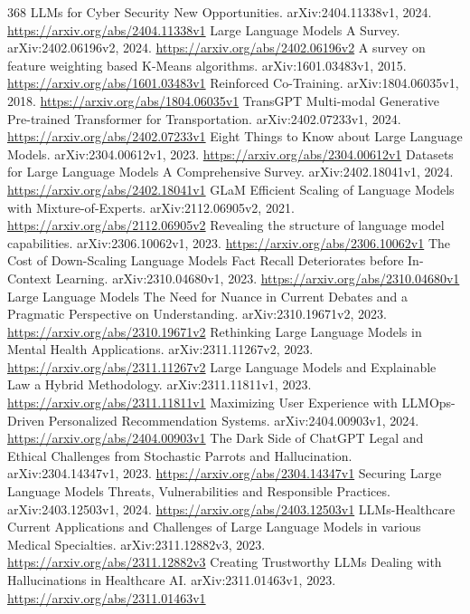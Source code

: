 \documentclass[11pt]{article}
\begin{document}
\begin{thebibliography}{368}
 LLMs for Cyber Security New Opportunities. arXiv:2404.11338v1, 2024. \url{https://arxiv.org/abs/2404.11338v1}
 Large Language Models A Survey. arXiv:2402.06196v2, 2024. \url{https://arxiv.org/abs/2402.06196v2}
 A survey on feature weighting based K-Means algorithms. arXiv:1601.03483v1, 2015. \url{https://arxiv.org/abs/1601.03483v1}
 Reinforced Co-Training. arXiv:1804.06035v1, 2018. \url{https://arxiv.org/abs/1804.06035v1}
 TransGPT Multi-modal Generative Pre-trained Transformer for Transportation. arXiv:2402.07233v1, 2024. \url{https://arxiv.org/abs/2402.07233v1}
 Eight Things to Know about Large Language Models. arXiv:2304.00612v1, 2023. \url{https://arxiv.org/abs/2304.00612v1}
 Datasets for Large Language Models A Comprehensive Survey. arXiv:2402.18041v1, 2024. \url{https://arxiv.org/abs/2402.18041v1}
 GLaM Efficient Scaling of Language Models with Mixture-of-Experts. arXiv:2112.06905v2, 2021. \url{https://arxiv.org/abs/2112.06905v2}
 Revealing the structure of language model capabilities. arXiv:2306.10062v1, 2023. \url{https://arxiv.org/abs/2306.10062v1}
 The Cost of Down-Scaling Language Models Fact Recall Deteriorates before In-Context Learning. arXiv:2310.04680v1, 2023. \url{https://arxiv.org/abs/2310.04680v1}
 Large Language Models The Need for Nuance in Current Debates and a Pragmatic Perspective on Understanding. arXiv:2310.19671v2, 2023. \url{https://arxiv.org/abs/2310.19671v2}
 Rethinking Large Language Models in Mental Health Applications. arXiv:2311.11267v2, 2023. \url{https://arxiv.org/abs/2311.11267v2}
 Large Language Models and Explainable Law a Hybrid Methodology. arXiv:2311.11811v1, 2023. \url{https://arxiv.org/abs/2311.11811v1}
 Maximizing User Experience with LLMOps-Driven Personalized Recommendation Systems. arXiv:2404.00903v1, 2024. \url{https://arxiv.org/abs/2404.00903v1}
 The Dark Side of ChatGPT Legal and Ethical Challenges from Stochastic Parrots and Hallucination. arXiv:2304.14347v1, 2023. \url{https://arxiv.org/abs/2304.14347v1}
 Securing Large Language Models Threats, Vulnerabilities and Responsible Practices. arXiv:2403.12503v1, 2024. \url{https://arxiv.org/abs/2403.12503v1}
 LLMs-Healthcare Current Applications and Challenges of Large Language Models in various Medical Specialties. arXiv:2311.12882v3, 2023. \url{https://arxiv.org/abs/2311.12882v3}
 Creating Trustworthy LLMs Dealing with Hallucinations in Healthcare AI. arXiv:2311.01463v1, 2023. \url{https://arxiv.org/abs/2311.01463v1}

\end{thebibliography}
\end{document}
